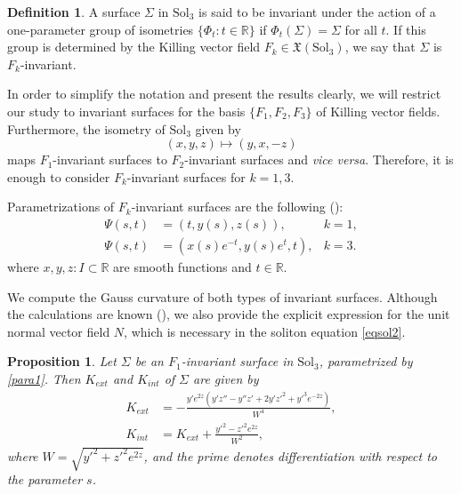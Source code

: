 \documentclass[a4paper,12pt]{amsart}
\theoremstyle{plain}
\newtheorem{proposition}[theorem]{Proposition}
\theoremstyle{definition}
\newtheorem{definition}[theorem]{Definition}
\def\r{\mathbb R}
\def\sol{\text{Sol}_3}
\begin{document}
 
 \begin{definition} A surface $\Sigma$ in $\sol$ is said to be invariant under the action of a one-parameter group of isometries $\{\Phi_t\colon t\in\r\}$ if $\Phi_t(\Sigma) = \Sigma$ for all $t$. If this group is determined by the Killing vector field $F_k\in\mathfrak{X}(\sol)$, we say that $\Sigma$ is $F_k$-invariant. 
 \end{definition} 
 
 
In order to simplify the notation and present the results clearly, we will restrict our study to invariant surfaces for the basis $\{F_1,F_2,F_3\}$ of Killing vector fields. Furthermore, the isometry of $\sol$ given by 
$$(x,y,z)\mapsto (y,x,-z)$$
maps $F_1$-invariant surfaces to $F_2$-invariant surfaces and {\it vice versa}. Therefore, it is enough to consider $F_k$-invariant surfaces for $k=1,3$. 

Parametrizations of $F_k$-invariant surfaces are the following (\cite{lm1,lm3}): 
\begin{align}
\Psi(s, t) &= (t, y(s), z(s)), &k=1,\label{para1}\\
\Psi(s, t)& = (x(s)e^{-t}, y(s)e^t, t), & k=3. \label{para3}
\end{align}
where $x,y,z\colon I\subset \r$ are smooth functions and $t\in\r$. 
 
 We compute the Gauss curvature of both types of invariant surfaces. Although the calculations are known (\cite{lm3}), we also provide the explicit expression for the unit normal vector field $N$, which is necessary in the soliton equation \eqref{eqsol2}.
 
 
 \begin{proposition} 
Let $\Sigma$ be an $F_1$-invariant surface in $\sol$, parametrized by \eqref{para1}. Then $K_{ext}$ and $K_{int}$ of $\Sigma$ are given by
\begin{align*}
K_{ext} &= -\frac{y' e^{2z}( y' z'' - y'' z' + 2y'z'^2 + y'^3 e^{-2z})}{W^4}, \\
K_{int} &= K_{ext} + \frac{y'^2 - z'^2 e^{2z}}{W^2},
\end{align*}
where $W =\sqrt{ y'^2 + z'^2 e^{2z}}$, and the prime denotes differentiation with respect to the parameter $s$.
\end{proposition}
\end{document}

